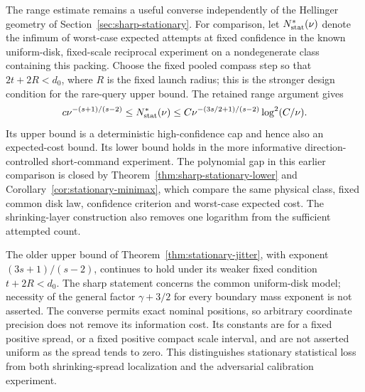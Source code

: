 The range estimate remains a useful converse independently of the
Hellinger geometry of Section~\ref{sec:sharp-stationary}. For comparison,
let $N^*_{\rm stat}(\nu)$ denote the infimum of worst-case expected
attempts at fixed confidence in the known uniform-disk, fixed-scale
reciprocal experiment on a nondegenerate class containing this packing.
Choose the fixed pooled compass step so that $2t+2R<d_0$, where $R$
is the fixed launch radius; this is the stronger design condition for
the rare-query upper bound. The retained range argument gives
\begin{equation}\label{eq:stationary-bracket}
 c\nu^{-(s+1)/(s-2)}
       \le N^*_{\rm stat}(\nu)
       \le C\nu^{-(3s/2+1)/(s-2)}\log^2(C/\nu).
\end{equation}
Its upper bound is a deterministic high-confidence cap and hence also
an expected-cost bound. Its lower bound holds in the more informative
direction-controlled short-command experiment. The polynomial gap in
this earlier comparison is closed by Theorem~\ref{thm:sharp-stationary-lower}
and Corollary~\ref{cor:stationary-minimax}, which compare the same
physical class, fixed common disk law, confidence criterion and
worst-case expected cost. The shrinking-layer construction also removes
one logarithm from the sufficient attempted count.

The older upper bound of Theorem~\ref{thm:stationary-jitter}, with
exponent $(3s+1)/(s-2)$, continues to hold under its weaker fixed
condition $t+2R<d_0$. The sharp statement concerns the common uniform-disk
model; necessity of the general factor $\gamma+3/2$ for every boundary
mass exponent is not asserted. The converse permits exact nominal
positions, so arbitrary coordinate precision does not remove its
information cost. Its constants are for a fixed positive spread, or a
fixed positive compact scale interval, and are not asserted uniform as
the spread tends to zero. This distinguishes stationary statistical
loss from both shrinking-spread localization and the adversarial
calibration experiment.
